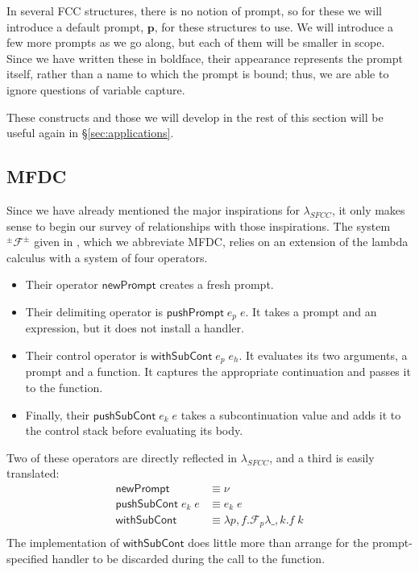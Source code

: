 \documentclass[11pt]{article}
\newcommand{\maybePage}{\null}
\newcommand\F{\mathcal{F}}
\newcommand\pmFpm{^\pm\F^\pm}
\begin{document}
In several FCC structures, there is no notion of prompt, so for these we will introduce a default prompt, $\mathbf{p}$, for these structures to use.
We will introduce a few more prompts as we go along, but each of them will be smaller in scope.
Since we have written these in boldface, their appearance represents the prompt itself, rather than a name to which the prompt is bound; thus, we are able to ignore questions of variable capture.

These constructs and those we will develop in the rest of this section will be useful again in \S\ref{sec:applications}.

\maybePage
\subsection{MFDC}

Since we have already mentioned the major inspirations for $\lambda_{SFCC}$, it only makes sense to begin our survey of relationships with those inspirations.
The system $\pmFpm$ given in \cite{MFDC}, which we abbreviate MFDC, relies on an extension of the lambda calculus with a system of four operators.

\begin{itemize}
\item Their operator $\mathsf{newPrompt}$ creates a fresh prompt.
\item Their delimiting operator is $\mathsf{pushPrompt}\;e_p\;e$.
It takes a prompt and an expression, but it does not install a handler.
\item Their control operator is $\mathsf{withSubCont}\;e_p\;e_h$.
It evaluates its two arguments, a prompt and a function.
It captures the appropriate continuation and passes it to the function.
\item Finally, their $\mathsf{pushSubCont}\;e_k\;e$ takes a subcontinuation value and adds it to the control stack before evaluating its body.
\end{itemize}

Two of these operators are directly reflected in $\lambda_{SFCC}$, and a third is easily translated:
\begin{align*}
\mathsf{newPrompt} &\equiv \nu \\
\mathsf{pushSubCont}\;e_k\;e &\equiv e_k\;e \\
\mathsf{withSubCont} &\equiv
    \lambda p,f. \F_{p}\lambda \_,k. f\;k \\
\end{align*}
The implementation of $\mathsf{withSubCont}$ does little more than arrange for the prompt-specified handler to be discarded during the call to the function.
\end{document}
